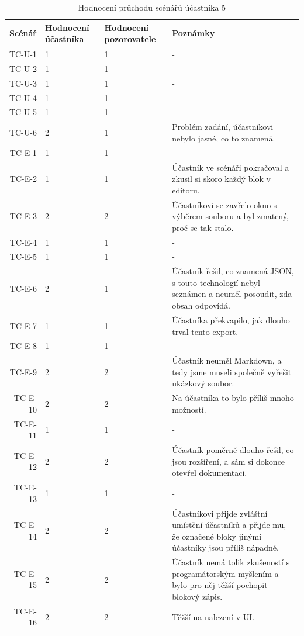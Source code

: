\begin{longtable}{r|p{2cm}|p{2cm}|p{6cm}}
    \caption{Hodnocení průchodu scénářů účastníka 5}\label{tab:hodnoceniPruchoduUcastnika5}\\
Scénář & Hodnocení účastníka & Hodnocení pozorovatele & Poznámky\\\hline\hline
TC-U-1   & 1 & 1 & - \\\hline
TC-U-2   & 1 & 1 & - \\\hline
TC-U-3   & 1 & 1 & - \\\hline
TC-U-4   & 1 & 1 & - \\\hline
TC-U-5   & 1 & 1 & - \\\hline
TC-U-6   & 2 & 1 & Problém zadání, účastníkovi nebylo jasné, co to znamená. \\\hline
TC-E-1   & 1 & 1 & - \\\hline
TC-E-2   & 1 & 1 & Účastník ve scénáři pokračoval a zkusil si skoro každý blok v editoru. \\\hline
TC-E-3   & 2 & 2 & Účastníkovi se zavřelo okno s výběrem souboru a byl zmatený, proč se tak stalo. \\\hline
TC-E-4   & 1 & 1 & - \\\hline
TC-E-5   & 1 & 1 & - \\\hline
TC-E-6   & 2 & 1 & Účastník řešil, co znamená JSON, s touto technologií nebyl seznámen a neuměl posoudit, zda obsah odpovídá. \\\hline
TC-E-7   & 1 & 1 & Účastníka překvapilo, jak dlouho trval tento export. \\\hline
TC-E-8   & 1 & 1 & - \\\hline
TC-E-9   & 2 & 2 & Účastník neuměl Markdown, a tedy jsme museli společně vyřešit ukázkový soubor. \\\hline
TC-E-10  & 2 & 2 & Na účastníka to bylo příliš mnoho možností. \\\hline
TC-E-11  & 1 & 1 & - \\\hline
TC-E-12  & 2 & 2 & Účastník poměrně dlouho řešil, co jsou rozšíření, a sám si dokonce otevřel dokumentaci. \\\hline
TC-E-13  & 1 & 1 & - \\\hline
TC-E-14  & 2 & 2 & Účastníkovi přijde zvláštní umístění účastníků a přijde mu, že označené bloky jinými účastníky jsou příliš nápadné. \\\hline
TC-E-15  & 2 & 2 & Účastník nemá tolik zkušeností s programátorským myšlením a bylo pro něj těžší pochopit blokový zápis. \\\hline
TC-E-16  & 2 & 2 & Těžší na nalezení v UI. \\\hline

\end{longtable}
